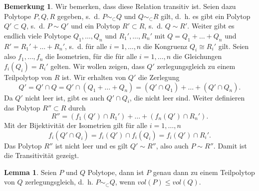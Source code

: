 \documentclass[11pt,titlepage]{article}
\theoremstyle{definition}
\newtheorem{lemma}[theorem]{Lemma}
\newtheorem{remark}[theorem]{Bemerkung}
\theoremstyle{remark}
\begin{document}
	\begin{remark}
		Wir bemerken, dass diese Relation transitiv ist. Seien 
		dazu Polytope $P,Q,R$ gegeben, s.~d. $P\sim_{\subset}Q$ und $Q\sim_{\subset}R$ 
		gilt, d.~h. es gibt ein Polytop $Q'\subset Q$, s.~d. $P\sim Q'$ und ein Polytop 
		$R'\subset R$, s.~d. $Q\sim R'$. Weiter gibt es endlich viele Polytope 
		$Q_1,\ldots,Q_n$ und $R_1',\ldots,R_n'$ mit $Q=Q_1+\ldots+Q_n$ und 
		$R'=R_1'+\ldots +R_n'$, s.~d. für alle $i=1,\ldots,n$ die 
		Kongruenz $Q_i\cong R_i'$ gilt. 
		Seien also $f_1,\ldots,f_n$ die Isometrien, für die für 
		alle $i=1,\ldots,n$ die Gleichungen $f_i(Q_i)=R_i'$ gelten. 
		Wir wollen zeigen, dass $Q'$ zerlegungsgleich zu einem 
		Teilpolytop von $R$ ist. Wir erhalten von $Q'$ die Zerlegung
		\[Q'=Q'\cap Q=Q'\cap(Q_1+\ldots+Q_n)=(Q'\cap Q_1)+\ldots+(Q'\cap Q_n).\]
		Da $Q'$ nicht leer ist, gibt es auch $Q'\cap Q_i$, die nicht leer sind. 
		Weiter definieren das Polytop $R''\subset R$ durch 
		\[R''=(f_1(Q')\cap R_1')+\ldots+(f_n(Q')\cap R_n').\]
		Mit der Bijektivität der Isometrien gilt für alle $i=1,\ldots,n$
		\[f_i(Q'\cap Q_i)=f_i(Q')\cap f_i(Q_i)=f_i(Q')\cap R_i'.\]
		Das Polytop $R''$ ist nicht leer und es gilt $Q'\sim R''$, also auch 
		$P\sim R''$. Damit ist die Transitivität gezeigt.
	\end{remark}
	
	\begin{lemma} \label{lemma:teilzerl}
		Seien $P$ und $Q$ Polytope, dann ist $P$ genau dann zu 
		einem Teilpolytop von $Q$ zerlegungsgleich, d.~h. $P\sim_{\subset}Q$, wenn $vol(P)\leq vol(Q)$.
	\end{lemma}
	
\end{document}
